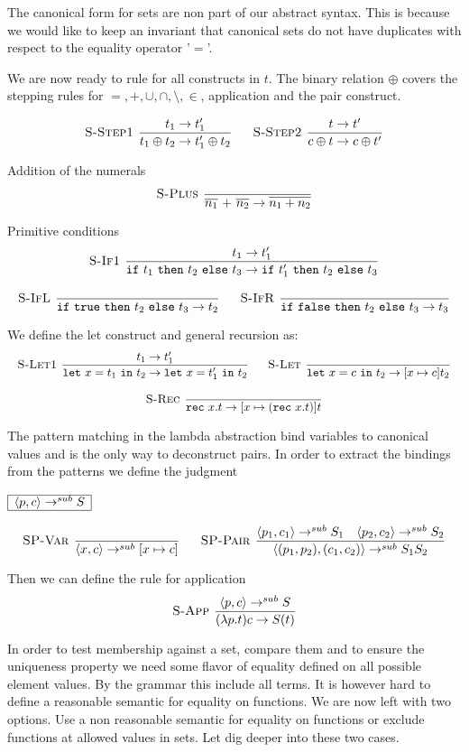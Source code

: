 \documentclass[a4paper]{article}
\newcommand{\s}[1]{\mathtt{#1}}
\newcommand{\sif}{\s{if\ }}
\newcommand{\sthen}{\s{\ then\ }}
\newcommand{\selse}{\s{\ else\ }}
\newcommand{\sifthenelse}[3]{\sif #1 \sthen #2 \selse #3}
\newcommand{\sletin}[2]{\s{let\ } #1 \s{\ in\ } #2}
\newcommand{\srec}{\s{rec\ }}
\newcommand{\strue}{\s{true}}
\newcommand{\sfalse}{\s{false}}
\newcommand{\step}{\to}
\newcommand{\stepsub}{\step^{sub}}
\newcommand{\angled}[1]{\langle #1\rangle}
\renewcommand{\rule}[3][]{\ \mbox{\textsc{#1 }}\dfrac{#2}{#3}\ }
\newcommand{\smbox}[1]{
  $\begin{array}{|c|}
    \hline
    #1 \\
    \hline
  \end{array}$
}
\begin{document}
 The canonical form for sets are non part of our abstract syntax. This
is because we would like to keep an invariant that canonical sets
do not have duplicates with respect to the equality operator '$\s{=}$'.


We are now ready to rule for all constructs in $t$. The binary relation $\oplus$ covers the stepping rules for $= ,+,\cup, \cap,\setminus,\in$, application and the pair construct.

\[\begin{array}{c}
\rule[S-Step1]{t_1 \step t_1'}{t_1 \oplus t_2 \step t_1' \oplus t_2}\quad
\rule[S-Step2]{t \step t'}{c \oplus t \step c \oplus t'}
\end{array}
\]

Addition of the numerals
\[
\rule[S-Plus]{}{\overline{n_1} \s{\ +\ } \overline{n_2} \step \overline{n_1 + n_2}}
\]

Primitive conditions
\[\begin{array}{c}
\rule[S-If1]{t_1 \step t_1'}{\sifthenelse{t_1}{t_2}{t_3} \step \sifthenelse{t_1'}{t_2}{t_3}}\\\\
\rule[S-IfL]{}{\sifthenelse{\strue}{t_2}{t_3} \step t_2}\quad
\rule[S-IfR]{}{\sifthenelse{\sfalse}{t_2}{t_3} \step t_3}
\end{array}\]

We define the let construct and general recursion as:
\[\begin{array}{c}
\rule[S-Let1]{t_1 \step t_1'}
  {\sletin{x=t_1}{t_2} \step \sletin{x=t_1'}{t_2}}\quad
\rule[S-Let]{}{\sletin{x=c}{t_2} \step [x \mapsto c ] t_2}\\\\
\rule[S-Rec]{}{\srec x.t \step [x \mapsto (\srec x.t)] t}
\end{array}\]


The pattern matching in the lambda abstraction bind variables to
canonical values and is the only way to deconstruct pairs.
In order to extract the bindings from the patterns we define the
judgment


\smbox{\angled{p,c} \stepsub S}
\[
\rule[SP-Var]{}{\angled{x,c} \stepsub [x\mapsto c]}\quad
\rule[SP-Pair]{\angled{p_1, c_1} \stepsub S_1 \quad \angled{p_2, c_2} \stepsub S_2}
{\angled{(p_1,p_2), (c_1, c_2)} \stepsub S_1S_2}
\]

Then we can define the rule for application
\[
\rule[S-App]{\angled{p, c} \stepsub S}{(\lambda p.t) c \step S(t)}
\]

In order to test membership against a set, compare them and to ensure the uniqueness property we need some flavor of equality defined on all possible element values. By the grammar this include all terms. It is however hard to define a reasonable semantic for equality on functions. We are now left with two options. Use a non reasonable semantic for equality on functions or exclude functions at allowed values in sets. Let dig deeper into these two cases.
\end{document}
